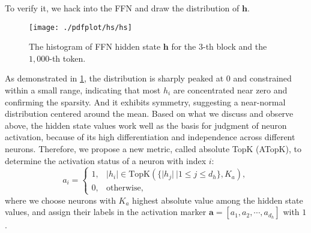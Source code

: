 To verify it, we hack into the FFN and draw the distribution of $\mathbf{h}$.
\begin{figure}[tb!]
    \centering
    \texttt{[image: ./pdfplot/hs/hs]}\vspace{-2mm} 
    \caption{The histogram of FFN hidden state $\mathbf{h}$ for the $3$-th block and the $1,000$-th token.
    }
    \label{fig:hs}\vspace{1mm}
\end{figure}
As demonstrated in \cref{fig:hs}, the distribution is sharply peaked at $0$ and constrained within a small range, indicating that most $h_i$ are concentrated near zero and confirming the sparsity.
And it exhibits symmetry, suggesting a near-normal distribution centered around the mean.
Based on what we discuss and observe above, the hidden state values work well as the basis for judgment of neuron activation, because of its high differentiation and independence across different neurons.
Therefore, we propose a new metric, called absolute TopK (ATopK), to determine the activation status of a neuron with index $i$:
\begin{equation}
    a_i = \left\{ \begin{array}{rl}
        1, & \lvert h_i \rvert \in \text{TopK}(\{ \lvert h_j \rvert \ | 1\leq j\leq d_h\}, K_a),  \\ 
        0, & \text{otherwise},
    \end{array}\right.
\end{equation}
where we choose neurons with $K_a$ highest absolute value among the hidden state values, and assign their labels in the activation marker $\mathbf{a} = \left[a_1, a_2, \cdots, a_{d_h}\right]$ with $1$.


